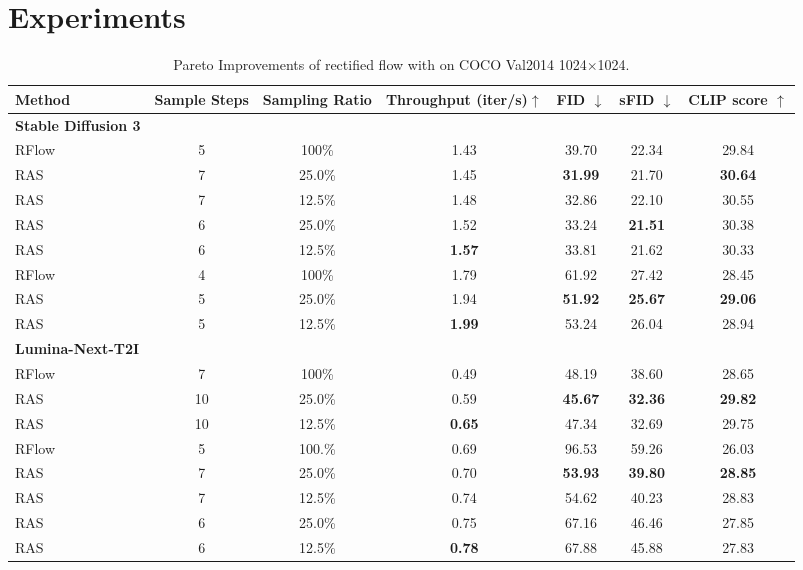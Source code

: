 \section{Experiments}
\label{sec.exp}



\begin{table*}[ht]
\centering

\begin{tabular}{lcccccc}
\hline
\textbf{Method} & \textbf{Sample Steps} & \textbf{Sampling Ratio} & \textbf{Throughput (iter/s)$\uparrow$} & \textbf{FID $\downarrow$} & \textbf{sFID $\downarrow$} & \textbf{CLIP score $\uparrow$} \\
\hline
\textbf{Stable Diffusion 3} & & & & & & \\
\hline
\rowcolor{gray!10}
RFlow & 5 & 100\% & 1.43 & 39.70 & 22.34 & 29.84 \\
RAS & 7 & 25.0\% & 1.45 & \textbf{31.99} & 21.70 & \textbf{30.64} \\
RAS & 7 & 12.5\% & 1.48 & 32.86 & 22.10 & 30.55 \\
RAS & 6 & 25.0\% & 1.52 & 33.24 & \textbf{21.51} & 30.38 \\
RAS & 6 & 12.5\% & \textbf{1.57} & 33.81 & 21.62 & 30.33 \\
\hline

\rowcolor{gray!10}
RFlow & 4 & 100\% & 1.79 & 61.92 & 27.42 & 28.45 \\
RAS & 5 & 25.0\% & 1.94 & \textbf{51.92} & \textbf{25.67} & \textbf{29.06} \\
RAS & 5 & 12.5\% & \textbf{1.99} & 53.24 & 26.04 & 28.94 \\



\hline
\textbf{Lumina-Next-T2I} & & & & & & \\
\hline
\rowcolor{gray!10}
RFlow & 7 & 100\% & 0.49 & 48.19 & 38.60 & 28.65 \\
RAS & 10 & 25.0\% & 0.59 & \textbf{45.67} & \textbf{32.36} & \textbf{29.82} \\
RAS & 10 & 12.5\% & \textbf{0.65} & 47.34 & 32.69 & 29.75 \\
\hline
\rowcolor{gray!10}
RFlow & 5 & 100.\% & 0.69 & 96.53 & 59.26 & 26.03 \\
RAS & 7 & 25.0\% & 0.70 & \textbf{53.93} & \textbf{39.80} & \textbf{28.85} \\
RAS & 7 & 12.5\% & 0.74 & 54.62 & 40.23 & 28.83 \\
RAS & 6 & 25.0\% & 0.75 & 67.16 & 46.46 & 27.85 \\
RAS & 6 & 12.5\% & \textbf{0.78} & 67.88 & 45.88 & 27.83 \\
\hline

\hline
\end{tabular}
\caption{Pareto Improvements of rectified flow with \ourmethod{} on COCO Val2014 1024$\times$1024.}
\label{tab:comparison}
\end{table*}

